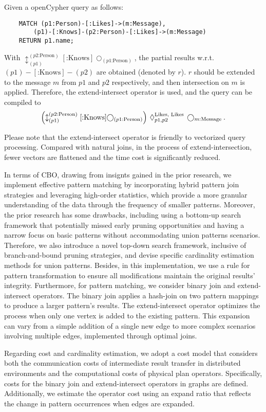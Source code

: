 Given a openCypher query as follows:
\begin{lstlisting}
    MATCH (p1:Person)-[:Likes]->(m:Message),
        (p1)-[:Knows]-(p2:Person)-[:Likes]->(m:Message)
    RETURN p1.name;
\end{lstlisting}
With $\updownarrow^{(p2\text{:Person})}_{(p1)}[\text{:Knows}]\bigcirc_{(p1\text{:Person})}$, the partial results w.r.t.~$(p1)-[\text{:Knows}]-(p2)$ are obtained (denoted by $r$). 
$r$ should be extended to the message $m$ from $p1$ and $p2$ respectively, and then intersection on $m$ is applied.
Therefore, the extend-intersect operator is used, and the query can be compiled to
\begin{equation}
    \left(\updownarrow^{(p2\text{:Person})}_{(p1)}[\text{:Knows}]\bigcirc_{(p1\text{:Person})}\right) \hspace{0.2em} \Diamond_{p1, p2}^{\text{Likes, Likes}} \hspace{0.2em} \bigcirc_{m\text{:Message}}.
\end{equation}

Please note that the extend-intersect operator is friendly to vectorized query processing.
Compared with natural joins, in the process of extend-intersection, fewer vectors are flattened and the time cost is significantly reduced.


In terms of CBO, drawing from insignts gained in the prior research, we implement effective pattern matching by incorporating hybrid pattern join strategies and leveraging high-order statistics, which provide a more granular understanding of the data through the frequency of smaller patterns.
Moreover, the prior research has some drawbacks, including using a bottom-up search framework that potentially missed early pruning opportunities and having a narrow focus on basic patterns without accommodating union patterns scenarios.
Therefore, we also introduce a novel top-down search framework, inclusive of branch-and-bound pruning strategies, and devise specific cardinality estimation methods for union patterns. 
Besides, in this implementation, we use a rule for pattern transformation to ensure all modifications maintain the original results’ integrity.
Furthermore, for pattern matching, we consider binary join and extend-intersect operators. 
The binary join applies a hash-join on two pattern mappings to produce a larger pattern's results.
The extend-intersect operator optimizes the process when only one vertex is added to the existing pattern. 
This expansion can vary from a simple addition of a single new edge to more complex scenarios involving multiple edges, implemented through optimal joins.

Regarding cost and cardinality estimation, we adopt a cost model that considers both the communication costs of intermediate result transfer in distributed environments and the computational costs of physical plan operators. 
Specifically, costs for the binary join and extend-intersect operators in graphs are defined. 
Additionally, we estimate the operator cost using an expand ratio that reflects the change in pattern occurrences when edges are expanded.
